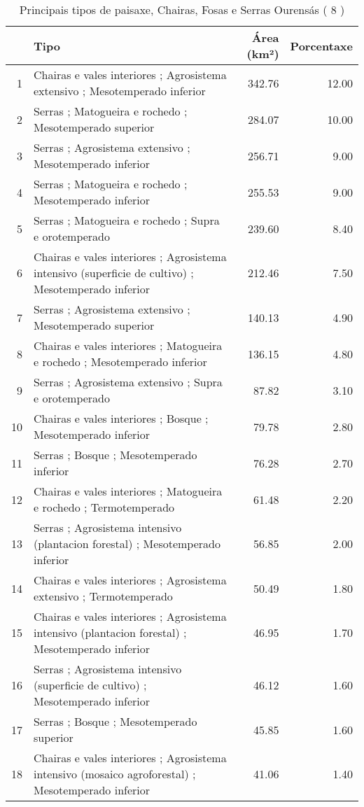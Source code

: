 \begin{table}[p]
\centering
\caption{Principais tipos de paisaxe,  Chairas, Fosas e Serras Ourensás ( 8 )} 
\label{Tipos 8}
\begin{tabular}{rlrr}
  \hline
 & Tipo & Área (km²) & Porcentaxe \\ 
  \hline
1 & Chairas e vales interiores ; Agrosistema extensivo ; Mesotemperado inferior & 342.76 & 12.00 \\ 
  2 & Serras ; Matogueira e rochedo ; Mesotemperado superior & 284.07 & 10.00 \\ 
  3 & Serras ; Agrosistema extensivo ; Mesotemperado inferior & 256.71 & 9.00 \\ 
  4 & Serras ; Matogueira e rochedo ; Mesotemperado inferior & 255.53 & 9.00 \\ 
  5 & Serras ; Matogueira e rochedo ; Supra e orotemperado & 239.60 & 8.40 \\ 
  6 & Chairas e vales interiores ; Agrosistema intensivo (superficie de cultivo) ; Mesotemperado inferior & 212.46 & 7.50 \\ 
  7 & Serras ; Agrosistema extensivo ; Mesotemperado superior & 140.13 & 4.90 \\ 
  8 & Chairas e vales interiores ; Matogueira e rochedo ; Mesotemperado inferior & 136.15 & 4.80 \\ 
  9 & Serras ; Agrosistema extensivo ; Supra e orotemperado & 87.82 & 3.10 \\ 
  10 & Chairas e vales interiores ; Bosque ; Mesotemperado inferior & 79.78 & 2.80 \\ 
  11 & Serras ; Bosque ; Mesotemperado inferior & 76.28 & 2.70 \\ 
  12 & Chairas e vales interiores ; Matogueira e rochedo ; Termotemperado & 61.48 & 2.20 \\ 
  13 & Serras ; Agrosistema intensivo (plantacion forestal) ; Mesotemperado inferior & 56.85 & 2.00 \\ 
  14 & Chairas e vales interiores ; Agrosistema extensivo ; Termotemperado & 50.49 & 1.80 \\ 
  15 & Chairas e vales interiores ; Agrosistema intensivo (plantacion forestal) ; Mesotemperado inferior & 46.95 & 1.70 \\ 
  16 & Serras ; Agrosistema intensivo (superficie de cultivo) ; Mesotemperado inferior & 46.12 & 1.60 \\ 
  17 & Serras ; Bosque ; Mesotemperado superior & 45.85 & 1.60 \\ 
  18 & Chairas e vales interiores ; Agrosistema intensivo (mosaico agroforestal) ; Mesotemperado inferior & 41.06 & 1.40 \\ 

\end{tabular}
\end{table}
